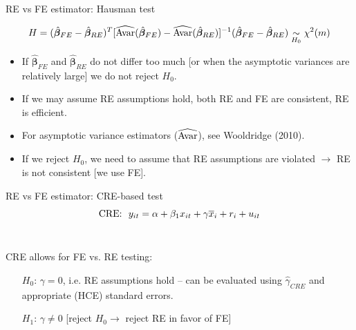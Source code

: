 \documentclass[usenames,dvipsnames]{beamer}
\begin{document}
\begin{frame}{RE vs FE estimator: Hausman test}

\small $$H=(\hat{\bm{\beta}}_{FE} - \hat{\bm{\beta}}_{RE})^T [\widehat{\textnormal{Avar}}(\hat{\bm{\beta}}_{FE}) - \widehat{\textnormal{Avar}}(\hat{\bm{\beta}}_{RE})]^{-1} (\hat{\bm{\beta}}_{FE} - \hat{\bm{\beta}}_{RE}) \underset{H_0}{\sim} \chi^2(m)$$
\begin{itemize}
    \item If $\hat{\bm{\beta}}_{FE}$ and $\hat{\bm{\beta}}_{RE}$ do not differ too much [or when the asymptotic variances are relatively large] we do not reject $H_0$. 
    \medskip
    \item If we may assume RE assumptions hold, both RE and FE are consistent, RE is efficient. 
    \medskip
    \item For asymptotic variance estimators ($\widehat{\textnormal{Avar}}$), see Wooldridge (2010). 
    \medskip
    \item If we reject $H_0$, we need to assume that RE assumptions are violated $\rightarrow$ RE is not consistent [we use FE].
\end{itemize}
\end{frame}
\begin{frame}{RE vs FE estimator: CRE-based test}
$$ \textnormal{CRE:}~~y_{it} = \alpha + \beta_1 x_{it} + \gamma \overline{x}_i + r_i + u_{it}$$ \\ \bigskip

CRE allows for FE vs. RE testing: \\ \medskip
	\begin{itemize}
	\item[$H_0$:] $\gamma = 0$, i.e. RE assumptions hold -- can be evaluated using $\hat{\gamma}_{\textit{CRE}}$ and appropriate (HCE) standard errors.
	\medskip
	\item[$H_1$:] $\gamma \neq 0$ [reject $H_0\rightarrow$ reject RE in favor of FE]
	\end{itemize}
\end{frame}
\end{document}
